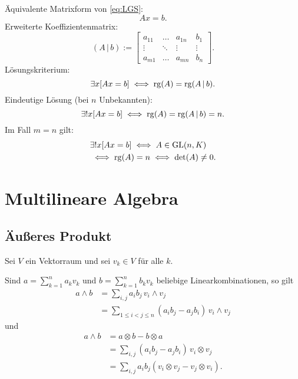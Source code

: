 Äquivalente Matrixform von \eqref{eq:LGS}:
\begin{equation}
Ax=b.
\end{equation}
Erweiterte Koeffizientenmatrix:
\begin{equation}
(A\,|\,b) := \left[\begin{array}{ccc|c}
a_{11} & \ldots & a_{1n} & b_1\\
\vdots & \ddots & \vdots & \vdots\\
a_{m1} & \ldots & a_{mn} & b_n
\end{array}\right].
\end{equation}
Lösungskriterium:
\begin{equation}
\exists x[Ax=b] \iff \operatorname*{rg}(A)=\operatorname*{rg}(A\,|\,b).
\end{equation}
Eindeutige Lösung (bei $n$ Unbekannten):
\begin{equation}
\exists! x[Ax=b] \iff\operatorname*{rg}(A)=\operatorname*{rg}(A\,|\,b)=n.
\end{equation}
Im Fall $m=n$ gilt:
\begin{equation}
\begin{split}
&\exists! x[Ax=b] \iff A\in\operatorname{GL}(n,K)\\
&\iff \operatorname*{rg}(A)=n \iff \det(A)\ne 0.
\end{split}
\end{equation}

\section{Multilineare Algebra}
\subsection{Äußeres Produkt}
Sei $V$ ein Vektorraum und sei $v_k\in V$ für alle $k$.

Sind $a=\sum_{k=1}^n a_k v_k$
und $b=\sum_{k=1}^n b_k v_k$ beliebige
Linearkombinationen, so gilt
\begin{equation}
\begin{split}
a\wedge b &= \sum_{i,j} a_i b_j\,v_i\wedge v_j\\
&= \sum_{1\le i<j\le n} (a_i b_j-a_j b_i)\,v_i\wedge v_j
\end{split}
\end{equation}
und
\begin{equation}
\begin{split}
a\wedge b &= a\otimes b-b\otimes a\\
&= \sum_{i,j} (a_i b_j-a_j b_i)\,v_i\otimes v_j\\
&= \sum_{i,j} a_i b_j (v_i\otimes v_j-v_j\otimes v_i).
\end{split}
\end{equation}
